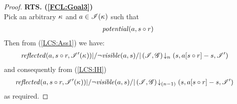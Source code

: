 \begin{lemma}[]
\begin{proof}
\noindent\textbf{RTS. (\ref{FCL:Goal3})}\\
Pick an arbitrary $\kappa_{}$ and $a \in \mathscr{I}(\kappa_{})$ such that 
\begin{align}
	\mathit{potential}(a, s \circ r) \label{FCL:Ass12}
\end{align}
Then from (\ref{LCS:Ass1}) we have: 
%
\begin{align*}
  &\mathit{reflected}(a, s \circ r,\mathscr{I}'(\kappa_{})) |/ \neg\mathit{visible}(a, s) /| \left(\mathscr{I}, \mathscr{G}\right) \!\downarrow_{n} \left(s, a[s \circ r]-s, \mathscr{I}'\right)  
\end{align*}
%
and consequently from (\ref{LCS:IH})
%
\begin{align*}
  &\mathit{reflected}(a, s \circ r, \mathscr{I}'(\kappa_{})) |/ \neg\mathit{visible}(a, s) /| \left(\mathscr{I}, \mathscr{G}\right) \!\downarrow_{(n-1)} \left(s, a[s \circ r]-s, \mathscr{I}'\right)  
\end{align*}
%
as required.

\end{proof}
\end{lemma}
%
%
